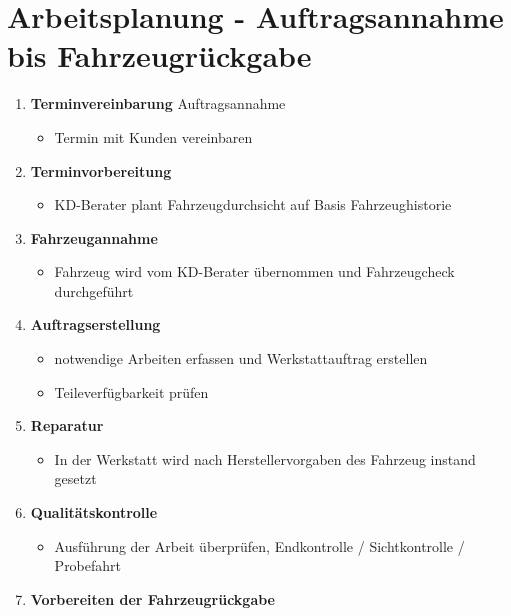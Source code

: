 \section{Arbeitsplanung - Auftragsannahme bis
Fahrzeugrückgabe}\label{arbeitsplanung-auftragsannahme-bis-fahrzeugrueckgabe}

\begin{enumerate}
\item
  \textbf{Terminvereinbarung} Auftragsannahme

  \begin{itemize}
  \item
    Termin mit Kunden vereinbaren
  \end{itemize}
\item
  \textbf{Terminvorbereitung}

  \begin{itemize}
  \item
    KD-Berater plant Fahrzeugdurchsicht auf Basis Fahrzeughistorie
  \end{itemize}
\item
  \textbf{Fahrzeugannahme}

  \begin{itemize}
  \item
    Fahrzeug wird vom KD-Berater übernommen und Fahrzeugcheck
    durchgeführt
  \end{itemize}
\item
  \textbf{Auftragserstellung}

  \begin{itemize}
  \item
    notwendige Arbeiten erfassen und Werkstattauftrag erstellen
  \item
    Teileverfügbarkeit prüfen
  \end{itemize}
\item
  \textbf{Reparatur}

  \begin{itemize}
  \item
    In der Werkstatt wird nach Herstellervorgaben des Fahrzeug instand
    gesetzt
  \end{itemize}
\item
  \textbf{Qualitätskontrolle}

  \begin{itemize}
  \item
    Ausführung der Arbeit überprüfen, Endkontrolle / Sichtkontrolle /
    Probefahrt
  \end{itemize}
\item
  \textbf{Vorbereiten der Fahrzeugrückgabe}


\end{enumerate}
